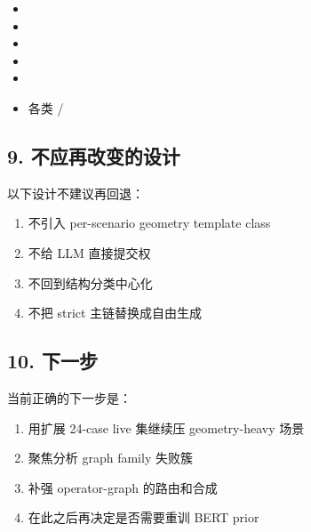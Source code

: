 \documentclass[11pt,a4paper]{ctexart}
\begin{document}
\begin{itemize}
\item {}
\item {}
\item {}
\item {}
\item {}
\item 各类  / 
\end{itemize}

\subsection*{9. 不应再改变的设计}

以下设计不建议再回退：

\begin{enumerate}
\item 不引入 per-scenario geometry template class
\item 不给 LLM 直接提交权
\item 不回到结构分类中心化
\item 不把 strict 主链替换成自由生成
\end{enumerate}

\subsection*{10. 下一步}

当前正确的下一步是：

\begin{enumerate}
\item 用扩展 24-case live 集继续压 geometry-heavy 场景
\item 聚焦分析 graph family 失败簇
\item 补强 operator-graph 的路由和合成
\item 在此之后再决定是否需要重训 BERT prior
\end{enumerate}
\end{document}
